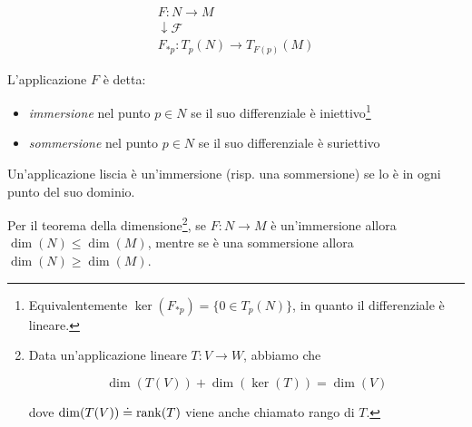 \begin{gather}
	F : N \to M\\
	\downarrow \mathcal{F} \nonumber\\
	F_{*p} : T_{p}(N) \to T_{F(p)}(M)
\end{gather}

L'applicazione $ F $ è detta:

\begin{itemize}
	\item \textit{immersione} nel punto $ p \in N $ se il suo differenziale è iniettivo\footnote{%
		Equivalentemente $ \ker(F_{*p}) = \{0 \in T_{p}(N)\} $, in quanto il differenziale è lineare.%
	}
	
	\item \textit{sommersione} nel punto $ p \in N $ se il suo differenziale è suriettivo
\end{itemize}

Un'applicazione liscia è un'immersione (risp. una sommersione) se lo è in ogni punto del suo dominio.

\begin{definition}
	Per il teorema della dimensione\footnote{%
		Data un'applicazione lineare $ T : V \to W $, abbiamo che
		
		\begin{equation*}
			\dim(T(V)) + \dim(\ker(T)) = \dim(V)
		\end{equation*}
		
		dove $ \dim(T(V)) \doteq \rank(T) $ viene anche chiamato rango di $ T $.%
	}, se $ F : N \to M $ è un'immersione allora $ \dim(N) \leqslant \dim(M) $, mentre se è una sommersione allora $ \dim(N) \geqslant \dim(M) $.
\end{definition}

